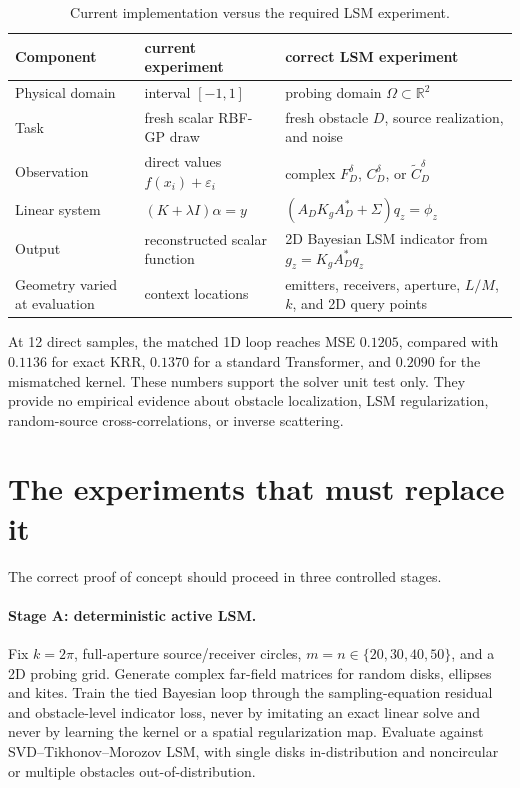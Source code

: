 \documentclass[10pt]{article}
\newcommand{\R}{\mathbb R}
\begin{document}
\begin{table}[H]
\centering
\caption{Current implementation versus the required LSM experiment.}
\begin{tabularx}{\linewidth}{@{}p{3.2cm}YY@{}}
\toprule
Component & current experiment & correct LSM experiment \\
\midrule
Physical domain & interval $[-1,1]$ & probing domain $\Omega\subset\R^2$ \\
Task & fresh scalar RBF-GP draw & fresh obstacle $D$, source realization, and noise \\
Observation & direct values $f(x_i)+\varepsilon_i$ & complex $F_D^\delta$, $C_D^\delta$, or $\widetilde C_D^\delta$ \\
Linear system & $(K+\lambda I)\alpha=y$ & $(A_DK_gA_D^*+\Sigma)q_z=\phi_z$ \\
Output & reconstructed scalar function & 2D Bayesian LSM indicator from $g_z=K_gA_D^*q_z$ \\
Geometry varied at evaluation & context locations & emitters, receivers, aperture, $L/M$, $k$, and 2D query points \\
\bottomrule
\end{tabularx}
\end{table}

At 12 direct samples, the matched 1D loop reaches MSE $0.1205$, compared with
$0.1136$ for exact KRR, $0.1370$ for a standard Transformer, and $0.2090$ for
the mismatched kernel.  These numbers support the solver unit test only.  They
provide no empirical evidence about obstacle localization, LSM regularization,
random-source cross-correlations, or inverse scattering.

\section{The experiments that must replace it}

The correct proof of concept should proceed in three controlled stages.

\paragraph{Stage A: deterministic active LSM.}
Fix $k=2\pi$, full-aperture source/receiver circles, $m=n\in\{20,30,40,50\}$,
and a 2D probing grid.  Generate complex far-field matrices for random disks,
ellipses and kites.  Train the tied Bayesian loop through the sampling-equation
residual and obstacle-level indicator loss, never by imitating an exact linear
solve and never by learning the kernel or a spatial regularization map.
Evaluate against SVD--Tikhonov--Morozov LSM, with single disks in-distribution
and noncircular or multiple obstacles out-of-distribution.
\end{document}
